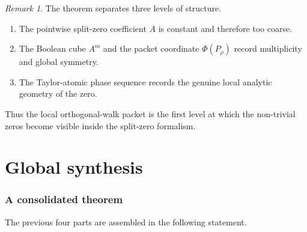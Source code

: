 \documentclass[11pt,a4paper]{article}
\numberwithin{equation}{section}
\theoremstyle{definition}
\theoremstyle{remark}
\newtheorem{remark}[theorem]{Remark}
\newcommand{\setpartprefix}[1]{\def\partprefix{#1}\setcounter{section}{0}}
\def\partprefix{0}
\begin{document}
\begin{remark}
The theorem separates three levels of structure.
\begin{enumerate}[label=(\arabic*)]
\item The pointwise split-zero coefficient $A$ is constant and therefore too coarse.
\item The Boolean cube $A^m$ and the packet coordinate $\Phi(P_\rho)$ record multiplicity and global symmetry.
\item The Taylor-atomic phase sequence records the genuine local analytic geometry of the zero.
\end{enumerate}
Thus the local orthogonal-walk packet is the first level at which the non-trivial zeros become visible inside the split-zero formalism.
\end{remark}



\part{Global synthesis}
\setpartprefix{V}

\section{A consolidated theorem}

The previous four parts are assembled in the following statement.
\end{document}
